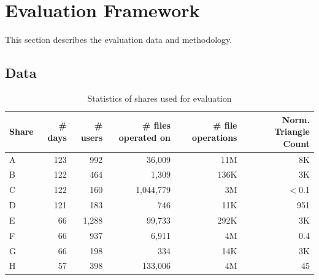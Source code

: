 \section{Evaluation Framework}
\label{sec:evaluation}
This section describes the evaluation data and methodology.

\subsection{Data}
\label{sec:data}
\begin{table}[!htpb]
\centering
\caption{Statistics of shares used for evaluation } 
{\fontsize{8pt}{1em}\selectfont
\begin{tabular}{|>{\centering}p{0.8cm}|r|r|r|r|r|}
\hline
\textbf{Share} & \textbf{\# days} & \textbf{\# users} & \textbf{\# files operated on} & \textbf{\# file operations} &\textbf{Norm. Triangle Count} \\
\hline
A & 123 & 992 & 36,009 & 11M &  8K \\ \hline
B & 122 & 464 & 1,309 & 136K &3K \\ \hline%
C & 122 & 160 & 1,044,779 & 3M &  $<$0.1\\ \hline
D & 121 & 183 & 746 & 11K & 951\\ \hline%
E & 66 &  1,288 & 99,733 & 292K &3K \\ \hline
F & 66 & 937 & 6,911 & 4M &0.4 \\ \hline
G & 66 & 198 & 334 & 14K  & 3K \\ \hline
H & 57 & 398 & 133,006 & 4M  &45\\  \hline
\end{tabular}
\label{tab:datasetstats1}
}
\end{table}

